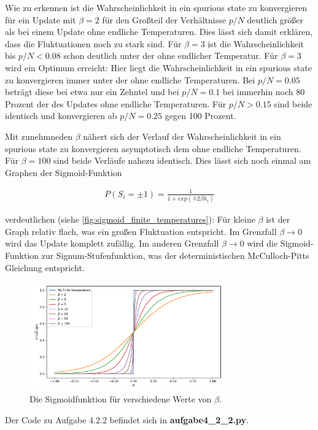Wie zu erkennen ist die Wahrscheinlichkeit in ein spurious state zu konvergieren für ein Update mit $\beta = 2$ für den Großteil der Verhältnisse $p/N$ deutlich größer als bei einem Update ohne endliche Temperaturen. Dies lässt sich damit erklären, dass die Fluktuationen noch zu stark sind. Für $\beta = 3$ ist die Wahrscheinlichkeit bis $p/N < 0.08$ schon deutlich unter der ohne endlicher Temperatur. Für $\beta = 3$ wird ein Optimum erreicht: Hier liegt die Wahrscheinlichkeit in ein spurious state zu konvergieren immer unter der ohne endliche Temperaturen. Bei $p/N =0.05$ beträgt diese bei etwa nur ein Zehntel und bei $p/N = 0.1$ bei immerhin noch 80 Prozent der des Updates ohne endliche Temperaturen. Für $p/N > 0.15$ sind beide identisch und konvergieren ab $p/N = 0.25$ gegen 100 Prozent.

Mit zunehmneden $\beta$ nähert sich der Verlauf der Wahrscheinlichkeit in ein spurious state zu konvergieren asymptotisch dem ohne endliche Temperaturen. Für $\beta = 100$ sind beide Verläufe nahezu identisch. Dies lässt sich noch einmal am Graphen der Sigmoid-Funktion

\begin{align}
P(S_i = \pm1) = \frac{1}{1 + exp(\mp2 \beta h_i)}
\end{align}

verdeutlichen (siehe \autoref{fig:sigmoid_finite_temperatures}): Für kleine $\beta$ ist der Graph relativ flach, was ein großen Fluktuation entspricht. Im Grenzfall $\beta \rightarrow 0$ wird das Update komplett zufällig. Im anderen Grenzfall $\beta \rightarrow 0$ wird die Sigmoid-Funktion zur Signum-Stufenfunktion, was der deterministischen McCulloch-Pitts Gleichung entspricht.

\begin{figure}[htp]
	\centering
	\includegraphics[width = 0.75\textwidth]{images/sigmoid_finite_temperatures.pdf}
	\caption{Die Sigmoidfunktion für verschiedene Werte von $\beta$.}
	\label{fig:sigmoid_finite_temperatures}
\end{figure}

Der Code zu Aufgabe 4.2.2 befindet sich in \textbf{aufgabe4\_2\_2.py}.














\clearpage
